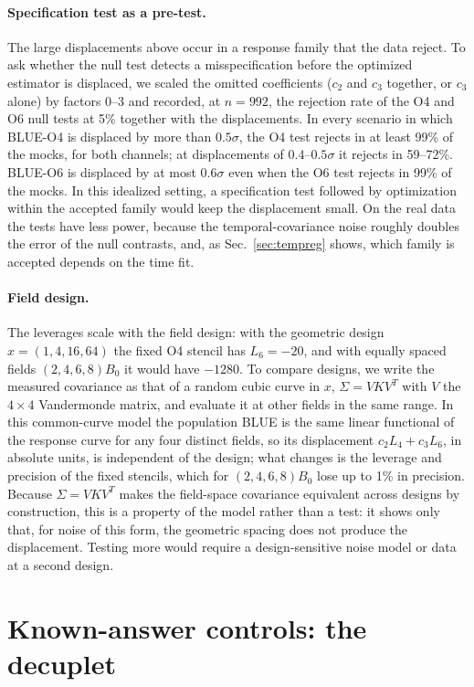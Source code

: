 \documentclass[aps,prd,reprint,twocolumn,superscriptaddress,nofootinbib,longbibliography]{revtex4-2}
\begin{document}
\paragraph{Specification test as a pre-test.} The large displacements above occur in a response family that the data reject. To ask whether the null test detects a misspecification before the optimized estimator is displaced, we scaled the omitted coefficients ($c_2$ and $c_3$ together, or $c_3$ alone) by factors 0--3 and recorded, at $n=992$, the rejection rate of the O4 and O6 null tests at 5\% together with the displacements. In every scenario in which BLUE-O4 is displaced by more than $0.5\sigma$, the O4 test rejects in at least 99\% of the mocks, for both channels; at displacements of $0.4$--$0.5\sigma$ it rejects in 59--72\%. BLUE-O6 is displaced by at most $0.6\sigma$ even when the O6 test rejects in 99\% of the mocks. In this idealized setting, a specification test followed by optimization within the accepted family would keep the displacement small. On the real data the tests have less power, because the temporal-covariance noise roughly doubles the error of the null contrasts, and, as Sec.~\ref{sec:tempreg} shows, which family is accepted depends on the time fit.

\paragraph{Field design.} The leverages scale with the field design: with the geometric design $x=(1,4,16,64)$ the fixed O4 stencil has $L_6=-20$, and with equally spaced fields $(2,4,6,8)B_0$ it would have $-1280$. To compare designs, we write the measured covariance as that of a random cubic curve in $x$, $\Sigma=VKV^T$ with $V$ the $4\times4$ Vandermonde matrix, and evaluate it at other fields in the same range. In this common-curve model the population BLUE is the same linear functional of the response curve for any four distinct fields, so its displacement $c_2L_4+c_3L_6$, in absolute units, is independent of the design; what changes is the leverage and precision of the fixed stencils, which for $(2,4,6,8)B_0$ lose up to 1\% in precision. Because $\Sigma=VKV^T$ makes the field-space covariance equivalent across designs by construction, this is a property of the model rather than a test: it shows only that, for noise of this form, the geometric spacing does not produce the displacement. Testing more would require a design-sensitive noise model or data at a second design.

\section{Known-answer controls: the decuplet}
\label{sec:decuplet}
\end{document}
